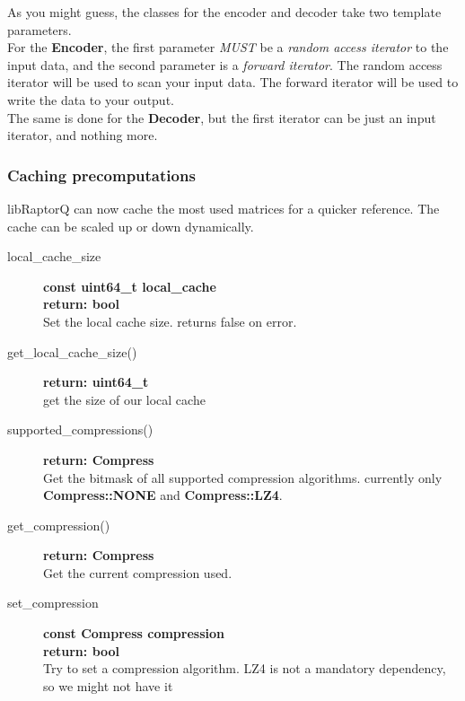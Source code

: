 \documentclass[11pt,a4paper]{refart}
\begin{document}
As you might guess, the classes for the encoder and decoder take two template parameters.\\
For the \textbf{Encoder}, the first parameter \textit{MUST} be a \textit{random access iterator} to the input data, and the second parameter is a
\textit{forward iterator}. The random access iterator will be used to scan your input data. The forward iterator will be used to write the data to your output.\\
The same is done for the \textbf{Decoder}, but the first iterator can be just an input iterator, 
and nothing more.

\subsubsection{Caching precomputations}
libRaptorQ can now cache the most used matrices for a quicker reference. The cache can be scaled up or down dynamically.

\begin{description}

\item[local\_cache\_size] \textbf{const uint64\_t local\_cache}\\
\textbf{return: bool}\\
Set the local cache size. returns false on error.

\item[get\_local\_cache\_size()] \textbf{return: uint64\_t}\\
get the size of our local cache

\item[supported\_compressions()] \textbf{return: Compress} \\
Get the bitmask of all supported compression algorithms. currently only \textbf{Compress::NONE} and \textbf{Compress::LZ4}.

\item[get\_compression()] \textbf{return: Compress} \\
Get the current compression used.

\item [set\_compression] \textbf{const Compress compression} \\
\textbf{return: bool}\\
Try to set a compression algorithm. LZ4 is not a mandatory dependency, so we might not have it

\end{description}


\newpage
\end{document}
